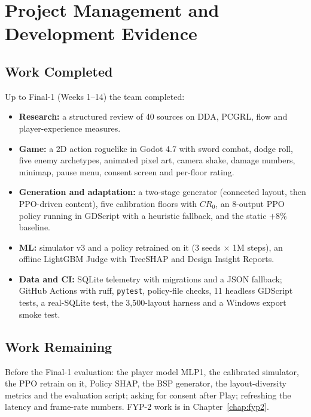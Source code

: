 \chapter{Project Management and Development Evidence}
\label{chap:mgmt}

\section{Work Completed}
Up to Final-1 (Weeks 1--14) the team completed:
\begin{itemize}
    \item \textbf{Research:} a structured review of 40 sources on DDA, PCGRL, flow and player-experience measures.
    \item \textbf{Game:} a 2D action roguelike in Godot 4.7 with sword combat, dodge roll, five enemy archetypes, animated pixel art, camera shake, damage numbers, minimap, pause menu, consent screen and per-floor rating.
    \item \textbf{Generation and adaptation:} a two-stage generator (connected layout, then PPO-driven content), five calibration floors with $CR_0$, an 8-output PPO policy running in GDScript with a heuristic fallback, and the static $+8\%$ baseline.
    \item \textbf{ML:} simulator v3 and a policy retrained on it (3 seeds $\times$ 1M steps), an offline LightGBM Judge with TreeSHAP and Design Insight Reports.
    \item \textbf{Data and CI:} SQLite telemetry with migrations and a JSON fallback; GitHub Actions with ruff, \texttt{pytest}, policy-file checks, 11 headless GDScript tests, a real-SQLite test, the 3,500-layout harness and a Windows export smoke test.
\end{itemize}

\section{Work Remaining}
Before the Final-1 evaluation: the player model MLP1, the calibrated simulator, the PPO retrain on it, Policy SHAP, the BSP generator, the layout-diversity metrics and the evaluation script; asking for consent after Play; refreshing the latency and frame-rate numbers. FYP-2 work is in Chapter~\ref{chap:fyp2}.

